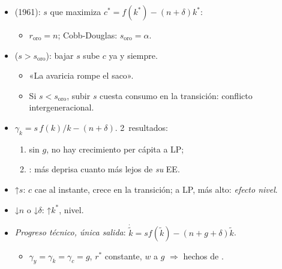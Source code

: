 \documentclass{article}
\begin{document}
\begin{columnas}
\begin{itemize}
\end{itemize}
\begin{itemize}
\item {} (1961): $s$ que maximiza $c^*=f(k^*)-(n+\delta)k^*$:
  \begin{itemize}
  \item $r_{\mathrm{oro}}=n$; Cobb-Douglas: $s_{\mathrm{oro}}=\alpha$.
  \end{itemize}
\end{itemize}
\begin{itemize}
\item {} ($s>s_{\mathrm{oro}}$): bajar $s$ sube $c$ ya y siempre.
  \begin{itemize}
  \item «La avaricia rompe el saco».
  \item Si $s<s_{\mathrm{oro}}$, subir $s$ cuesta consumo en la transición: conflicto intergeneracional.
  \end{itemize}
\end{itemize}
\begin{itemize}
\item $\gamma_k=s\,f(k)/k-(n+\delta)$. 2~resultados:
  \begin{enumerate}
  \item sin $g$, no hay crecimiento per cápita a LP;
  \item {}: más deprisa cuanto más lejos de \emph{su} EE.
  \end{enumerate}
\end{itemize}
\begin{itemize}
\item ↑$s$: $c$ cae al instante, crece en la transición; a LP, más alto: \emph{efecto nivel}.
\item ↓$n$ o ↓$\delta$: ↑$k^*$, nivel.
\item \emph{Progreso técnico, única salida}: $\dot{\tilde k}=sf(\tilde k)-(n+g+\delta)\tilde k$.
  \begin{itemize}
  \item $\gamma_y=\gamma_k=\gamma_c=g$, $r^*$ constante, $w$ a $g$ $\Rightarrow$ hechos de .

\end{itemize}
\end{itemize}
\end{columnas}
\end{document}
